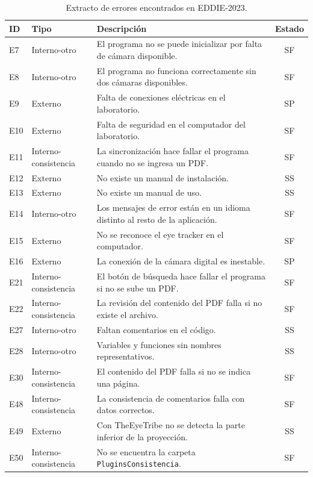 \begin{table}[H]
\centering
\caption{Extracto de errores encontrados en EDDIE-2023.}
\label{tab:extracto_errores}
\footnotesize
\begin{tabularx}{\textwidth}{l l X c}
\toprule
\textbf{ID} & \textbf{Tipo} & \textbf{Descripción} & \textbf{Estado} \\ \midrule
E7 & Interno-otro & El programa no se puede inicializar por falta de cámara disponible. & SF \\
E8 & Interno-otro & El programa no funciona correctamente sin dos cámaras disponibles. & SF \\
E9 & Externo & Falta de conexiones eléctricas en el laboratorio. & SP \\
E10 & Externo & Falta de seguridad en el computador del laboratorio. & SF \\
E11 & Interno-consistencia & La sincronización hace fallar el programa cuando no se ingresa un PDF. & SF \\
E12 & Externo & No existe un manual de instalación. & SS \\
E13 & Externo & No existe un manual de uso. & SS \\
E14 & Interno-otro & Los mensajes de error están en un idioma distinto al resto de la aplicación. & SF \\
E15 & Externo & No se reconoce el eye tracker en el computador. & SF \\
E16 & Externo & La conexión de la cámara digital es inestable. & SP \\
E21 & Interno-consistencia & El botón de búsqueda hace fallar el programa si no se sube un PDF. & SF \\
E22 & Interno-consistencia & La revisión del contenido del PDF falla si no existe el archivo. & SF \\
E27 & Interno-otro & Faltan comentarios en el código. & SS \\
E28 & Interno-otro & Variables y funciones sin nombres representativos. & SS \\
E30 & Interno-consistencia & El contenido del PDF falla si no se indica una página. & SF \\
E48 & Interno-consistencia & La consistencia de comentarios falla con datos correctos. & SF \\
E49 & Externo & Con TheEyeTribe no se detecta la parte inferior de la proyección. & SS \\
E50 & Interno-consistencia & No se encuentra la carpeta \texttt{PluginsConsistencia}. & SF \\ \bottomrule
\end{tabularx}
\end{table}

